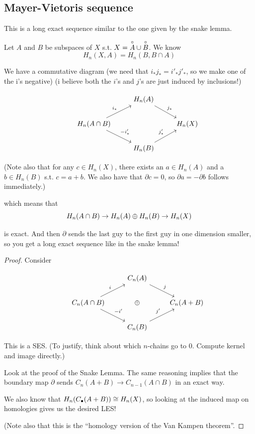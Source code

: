 \documentclass[11pt,leqno,oneside]{amsart}
\newenvironment{dateenv}{
  \vspace{1em}
}{
  \vspace{1em}
}
\newcommand{\mydate}[4]{
  \newdate{#1}{#2}{#3}{#4}
  \begin{dateenv}
    \hfill\displaydate{#1}
  \end{dateenv}
}
\numberwithin{thm}{section}
\renewcommand{\d}{\partial}
\newcommand{\homl}[1][n]{H_{#1}}
\begin{document}
\mydate{dm}{21}{4}{2017}
\renewcommand{\homl}[1][n]{H_{#1}}
\subsection{Mayer-Vietoris sequence}

This is a long exact sequence similar to the one given by the snake lemma.

Let $A$ and $B$ be subspaces of $X$ s.t. $X = \overset{\circ}{A} \cup \overset{\circ}{B}$.  We know
$$ \homl(X, A) = \homl(B, B \cap A) $$

We have a commutative diagram (we need that $i_* j_* = i'_* j'_*$, so we make one of the i's negative) (i believe both the $i$'s and $j$'s are just induced by inclusions!)

$$\begin{tikzcd}
  &\, & \homl(A) \arrow[rd, "j_*"] \\
  &\homl(A \cap B) \arrow[ru, "i_*"] \arrow[rd, "-i'_*"] & &\homl(X) \\
  & &\homl(B) \arrow[ru, "j'_*"]
\end{tikzcd}$$

(Note also that for any $c \in \homl(X)$, there exists an $a \in \homl(A)$ and a $b \in \homl(B)$ s.t. $c = a + b$.  We also have that $\d c = 0$, so $\d a = - \d b$ follows immediately.)

which means that
$$ \homl(A \cap B) \to \homl(A) \dsum \homl(B) \to \homl(X) $$

is exact.  And then $\d$ sends the last guy to the first guy in one dimension smaller, so you get a long exact sequence like in the snake lemma!

\begin{proof}
  Consider

  $$\begin{tikzcd}
  &\, & C_n(A) \arrow[rd, "j"] \\
  &C_n(A \cap B) \arrow[ru, "i"] \arrow[rd, "-i'"] &\dsum &C_n(A + B) \\
  & &C_n(B) \arrow[ru, "j'"]
  \end{tikzcd}$$

  This is a SES.  (To justify, think about which $n$-chains go to 0.  Compute kernel and image directly.)

  Look at the proof of the Snake Lemma.  The same reasoning implies that the boundary map $\d$ sends $C_n(A + B) \to C_{n-1}(A \cap B)$ in an exact way.

  We also know that $\homl(C_\bullet(A+B)) \isom \homl(X)$, so looking at the induced map on homologies gives us the desired LES!

  (Note also that this is the ``homology version of the Van Kampen theorem''.
\end{proof}
\end{document}
